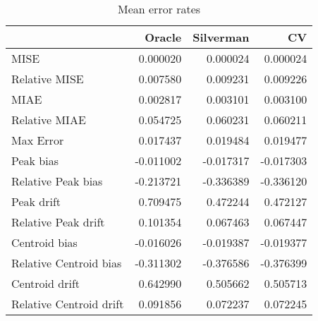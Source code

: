 \begin{table}[ht]
\centering
\begin{tabular}{lrrr}
  \hline
 & Oracle & Silverman & CV \\ 
  \hline
MISE & 0.000020 & 0.000024 & 0.000024 \\ 
  Relative MISE & 0.007580 & 0.009231 & 0.009226 \\ 
  MIAE & 0.002817 & 0.003101 & 0.003100 \\ 
  Relative MIAE & 0.054725 & 0.060231 & 0.060211 \\ 
  Max Error & 0.017437 & 0.019484 & 0.019477 \\ 
  Peak bias & -0.011002 & -0.017317 & -0.017303 \\ 
  Relative Peak bias & -0.213721 & -0.336389 & -0.336120 \\ 
  Peak drift & 0.709475 & 0.472244 & 0.472127 \\ 
  Relative Peak drift & 0.101354 & 0.067463 & 0.067447 \\ 
  Centroid bias & -0.016026 & -0.019387 & -0.019377 \\ 
  Relative Centroid bias & -0.311302 & -0.376586 & -0.376399 \\ 
  Centroid drift & 0.642990 & 0.505662 & 0.505713 \\ 
  Relative Centroid drift & 0.091856 & 0.072237 & 0.072245 \\ 
   \hline
\end{tabular}
\caption{Mean error rates} 
\label{tbl:mean_error_rates}
\end{table}
